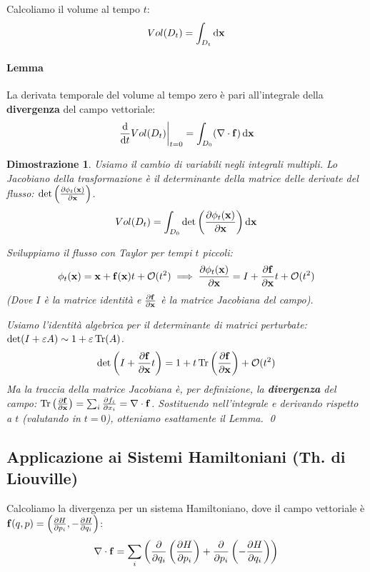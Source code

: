 \documentclass[openany]{book}
\newtheorem*{dimostrazione}{Dimostrazione}
\theoremstyle{definition}
\theoremstyle{remark}
\begin{document}
Calcoliamo il volume al tempo $t$:
\begin{equation}
    Vol(D_t) = \int_{D_t} \dd{\vb{x}}
\end{equation}

\paragraph{Lemma}
La derivata temporale del volume al tempo zero è pari all'integrale della \textbf{divergenza} del campo vettoriale:
\begin{equation}
    \eval{ \dv{t} Vol(D_t) }_{t=0} = \int_{D_0} (\nabla \cdot \vb{f}) \dd{\vb{x}}
\end{equation}

\begin{dimostrazione}
Usiamo il cambio di variabili negli integrali multipli. Lo Jacobiano della trasformazione è il determinante della matrice delle derivate del flusso: $\det\left( \pdv{\phi_t(\vb{x})}{\vb{x}} \right)$.
\begin{equation*}
    Vol(D_t) = \int_{D_0} \det\left( \pdv{\phi_t(\vb{x})}{\vb{x}} \right) \dd{\vb{x}}
\end{equation*}

Sviluppiamo il flusso con Taylor per tempi $t$ piccoli: 
$$ \phi_t(\vb{x}) = \vb{x} + \vb{f}(\vb{x})t + \mathcal{O}(t^2) \implies \pdv{\phi_t(\vb{x})}{\vb{x}} = I + \pdv{\vb{f}}{\vb{x}}t + \mathcal{O}(t^2) $$
(Dove $I$ è la matrice identità e $\pdv{\vb{f}}{\vb{x}}$ è la matrice Jacobiana del campo).

Usiamo l'identità algebrica per il determinante di matrici perturbate: $\det(I + \varepsilon A) \sim 1 + \varepsilon \Tr(A)$.
\begin{equation*}
    \det\left( I + \pdv{\vb{f}}{\vb{x}} t \right) = 1 + t \Tr\left( \pdv{\vb{f}}{\vb{x}} \right) + \mathcal{O}(t^2)
\end{equation*}
Ma la traccia della matrice Jacobiana è, per definizione, la \textbf{divergenza} del campo: $\Tr\left( \pdv{\vb{f}}{\vb{x}} \right) = \sum_i \pdv{f_i}{x_i} = \nabla \cdot \vb{f}$.
Sostituendo nell'integrale e derivando rispetto a $t$ (valutando in $t=0$), otteniamo esattamente il Lemma. \qed
\end{dimostrazione}

\subsection*{Applicazione ai Sistemi Hamiltoniani (Th. di Liouville)}
Calcoliamo la divergenza per un sistema Hamiltoniano, dove il campo vettoriale è $\vb{f}(q,p) = \left( \pdv{H}{p_i}, -\pdv{H}{q_i} \right)$:
\begin{equation*}
    \nabla \cdot \vb{f} = \sum_i \left( \pdv{q_i} \left( \pdv{H}{p_i} \right) + \pdv{p_i} \left( -\pdv{H}{q_i} \right) \right)
\end{equation*}
\end{document}
